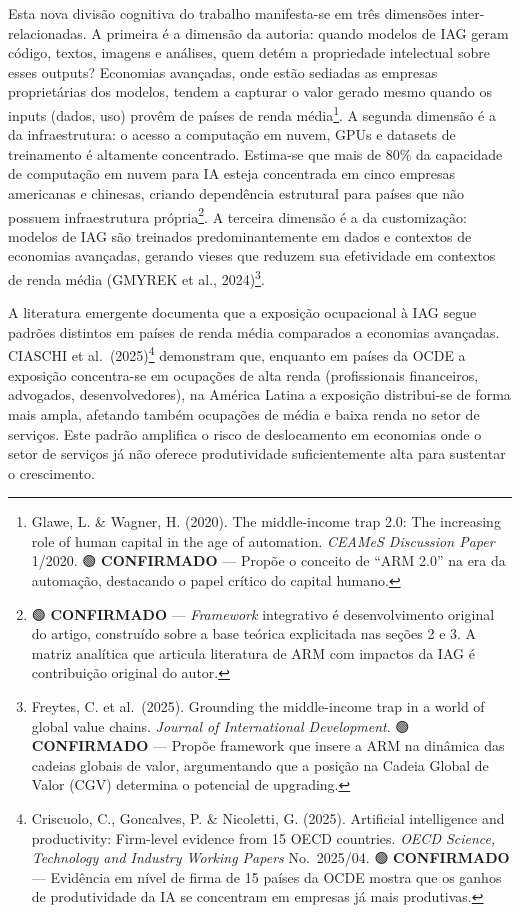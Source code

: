 \documentclass[
  brazilian,
  12pt,
]{article}
\begin{document}
Esta nova divisão cognitiva do trabalho manifesta-se em três dimensões inter-relacionadas. A primeira é a dimensão da autoria: quando modelos de IAG geram código, textos, imagens e análises, quem detém a propriedade intelectual sobre esses outputs? Economias avançadas, onde estão sediadas as empresas proprietárias dos modelos, tendem a capturar o valor gerado mesmo quando os inputs (dados, uso) provêm de países de renda média\footnote{Glawe, L. \& Wagner, H. (2020). The middle-income trap 2.0: The increasing role of human capital in the age of automation. \emph{CEAMeS Discussion Paper} 1/2020. 🟢 \textbf{CONFIRMADO} --- Propõe o conceito de ``ARM 2.0'' na era da automação, destacando o papel crítico do capital humano.}. A segunda dimensão é a da infraestrutura: o acesso a computação em nuvem, GPUs e datasets de treinamento é altamente concentrado. Estima-se que mais de 80\% da capacidade de computação em nuvem para IA esteja concentrada em cinco empresas americanas e chinesas, criando dependência estrutural para países que não possuem infraestrutura própria\footnote{🟢 \textbf{CONFIRMADO} --- \emph{Framework} integrativo é desenvolvimento original do artigo, construído sobre a base teórica explicitada nas seções 2 e 3. A matriz analítica que articula literatura de ARM com impactos da IAG é contribuição original do autor.}. A terceira dimensão é a da customização: modelos de IAG são treinados predominantemente em dados e contextos de economias avançadas, gerando vieses que reduzem sua efetividade em contextos de renda média (GMYREK et al., 2024)\footnote{Freytes, C. et al.~(2025). Grounding the middle-income trap in a world of global value chains. \emph{Journal of International Development}. 🟢 \textbf{CONFIRMADO} --- Propõe framework que insere a ARM na dinâmica das cadeias globais de valor, argumentando que a posição na Cadeia Global de Valor (CGV) determina o potencial de upgrading.}.

A literatura emergente documenta que a exposição ocupacional à IAG segue padrões distintos em países de renda média comparados a economias avançadas. CIASCHI et al.~(2025)\footnote{Criscuolo, C., Goncalves, P. \& Nicoletti, G. (2025). Artificial intelligence and productivity: Firm-level evidence from 15 OECD countries. \emph{OECD Science, Technology and Industry Working Papers} No.~2025/04. 🟢 \textbf{CONFIRMADO} --- Evidência em nível de firma de 15 países da OCDE mostra que os ganhos de produtividade da IA se concentram em empresas já mais produtivas.} demonstram que, enquanto em países da OCDE a exposição concentra-se em ocupações de alta renda (profissionais financeiros, advogados, desenvolvedores), na América Latina a exposição distribui-se de forma mais ampla, afetando também ocupações de média e baixa renda no setor de serviços. Este padrão amplifica o risco de deslocamento em economias onde o setor de serviços já não oferece produtividade suficientemente alta para sustentar o crescimento.
\end{document}

